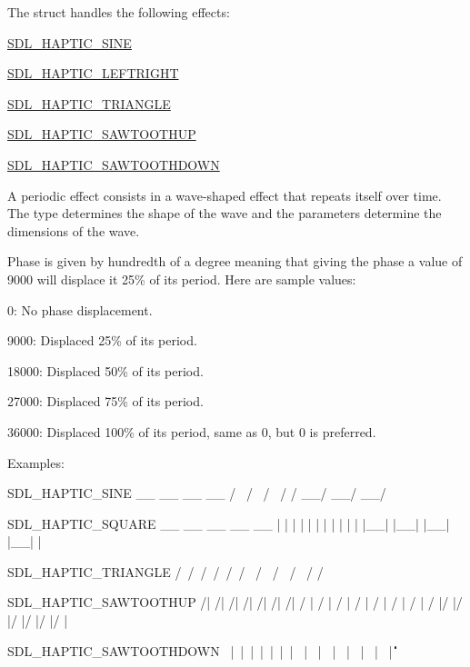 The struct handles the following effects\+:
\begin{DoxyItemize}
\item \hyperlink{SDL__haptic_8h_aa6d75adbfcdda5075078e7a2849da5c0}{S\+D\+L\+\_\+\+H\+A\+P\+T\+I\+C\+\_\+\+S\+I\+NE}
\item \hyperlink{SDL__haptic_8h_ae047624d8458ff6400887c37a36f86d3}{S\+D\+L\+\_\+\+H\+A\+P\+T\+I\+C\+\_\+\+L\+E\+F\+T\+R\+I\+G\+HT}
\item \hyperlink{SDL__haptic_8h_ae8123eaa51511507375ba6ef9220fa46}{S\+D\+L\+\_\+\+H\+A\+P\+T\+I\+C\+\_\+\+T\+R\+I\+A\+N\+G\+LE}
\item \hyperlink{SDL__haptic_8h_ab8e3f40f3c2bcee8905d13b634363c3f}{S\+D\+L\+\_\+\+H\+A\+P\+T\+I\+C\+\_\+\+S\+A\+W\+T\+O\+O\+T\+H\+UP}
\item \hyperlink{SDL__haptic_8h_afd64aa747034a7ccf4b55f6246525701}{S\+D\+L\+\_\+\+H\+A\+P\+T\+I\+C\+\_\+\+S\+A\+W\+T\+O\+O\+T\+H\+D\+O\+WN}
\end{DoxyItemize}

A periodic effect consists in a wave-\/shaped effect that repeats itself over time. The type determines the shape of the wave and the parameters determine the dimensions of the wave.

Phase is given by hundredth of a degree meaning that giving the phase a value of 9000 will displace it 25\% of its period. Here are sample values\+:
\begin{DoxyItemize}
\item 0\+: No phase displacement.
\item 9000\+: Displaced 25\% of its period.
\item 18000\+: Displaced 50\% of its period.
\item 27000\+: Displaced 75\% of its period.
\item 36000\+: Displaced 100\% of its period, same as 0, but 0 is preferred.
\end{DoxyItemize}

Examples\+: \begin{DoxyVerb}SDL_HAPTIC_SINE
  __      __      __      __
 /  \    /  \    /  \    /
/    \__/    \__/    \__/

SDL_HAPTIC_SQUARE
 __    __    __    __    __
|  |  |  |  |  |  |  |  |  |
|  |__|  |__|  |__|  |__|  |

SDL_HAPTIC_TRIANGLE
  /\    /\    /\    /\    /\
 /  \  /  \  /  \  /  \  /
/    \/    \/    \/    \/

SDL_HAPTIC_SAWTOOTHUP
  /|  /|  /|  /|  /|  /|  /|
 / | / | / | / | / | / | / |
/  |/  |/  |/  |/  |/  |/  |

SDL_HAPTIC_SAWTOOTHDOWN
\  |\  |\  |\  |\  |\  |\  |
 \ | \ | \ | \ | \ | \ | \ |
  \|  \|  \|  \|  \|  \|  \|
\end{DoxyVerb}


